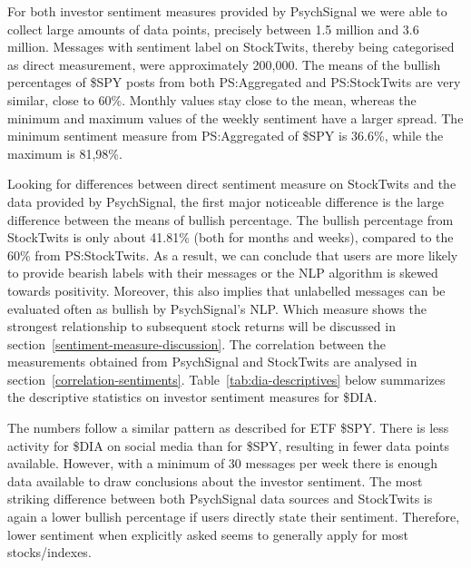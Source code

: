 For both investor sentiment measures provided by PsychSignal we were able to collect large amounts of data points, precisely between 1.5 million and 3.6 million. Messages with sentiment label on StockTwits, thereby being categorised as direct measurement, were approximately 200,000. The means of the bullish percentages of \$SPY posts from both PS:Aggregated and PS:StockTwits are very similar, close to 60\%. Monthly values stay close to the mean, whereas the minimum and maximum values of the weekly sentiment have a larger spread. The minimum sentiment measure from PS:Aggregated of \$SPY is 36.6\%, while the maximum is 81,98\%.
\par
Looking for differences between direct sentiment measure on StockTwits and the data provided by PsychSignal, the first major noticeable difference is the large difference between the means of bullish percentage. The bullish percentage from StockTwits is only about 41.81\% (both for months and weeks), compared to the 60\% from PS:StockTwits. As a result, we can conclude that users are more likely to provide bearish labels with their messages or the NLP algorithm is skewed towards positivity. Moreover, this also implies that unlabelled messages can be evaluated often as bullish by PsychSignal's NLP. Which measure shows the strongest relationship to subsequent stock returns will be discussed in section~\ref{sentiment-measure-discussion}. The correlation between the measurements obtained from PsychSignal and StockTwits are analysed in section~\ref{correlation-sentiments}. Table~\ref{tab:dia-descriptives} below summarizes the descriptive statistics on investor sentiment measures for \$DIA.



\par
The numbers follow a similar pattern as described for ETF \$SPY. There is less activity for \$DIA on social media than for \$SPY, resulting in fewer data points available. However, with a minimum of 30 messages per week there is enough data available to draw conclusions about the investor sentiment. The most striking difference between both PsychSignal data sources and StockTwits is again a lower bullish percentage if users directly state their sentiment. Therefore, lower sentiment when explicitly asked seems to generally apply for most stocks/indexes.


